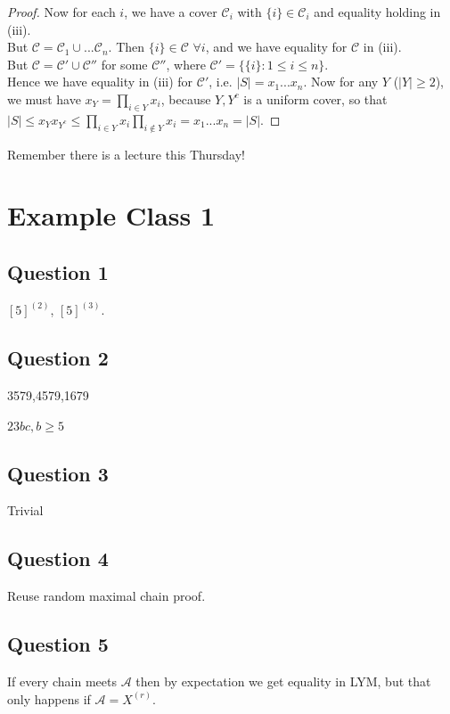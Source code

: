 \documentclass[a4paper]{article}
\begin{document}
\begin{thm}
\begin{proof}
        Now for each $i$, we have a cover $\mathcal{C}_i$ with $\{i\} \in \mathcal{C}_i$ and equality holding in (iii).\\
        But $\mathcal{C} = \mathcal{C}_1 \cup ... \mathcal{C}_n$. Then $\{i\} \in \mathcal{C}$ $\forall i$, and we have equality for $\mathcal{C}$ in (iii).\\
        But $\mathcal{C} = \mathcal{C}' \cup \mathcal{C}''$ for some $\mathcal{C}''$, where $\mathcal{C}' = \{\{i\}:1 \leq i \leq n\}$.\\
        Hence we have equality in (iii) for $\mathcal{C}'$, i.e. $|S| = x_1...x_n$. Now for any $Y$ ($|Y| \geq 2$), we must have $x_Y = \prod_{i \in Y} x_i$, because $Y,Y^c$ is a uniform cover, so that $|S| \leq x_Y x_{Y^c} \leq \prod_{i \in Y} x_i \prod_{i \not\in Y} x_i = x_1...x_n = |S|$.
    \end{proof}
\end{thm}

Remember there is a lecture this Thursday!




\newpage

\section{Example Class 1}

\subsection{Question 1}
$[5]^{(2)}$, $[5]^{(3)}$.

\subsection{Question 2}
3579,4579,1679

$23bc, b \geq 5$

\subsection{Question 3}
Trivial

\subsection{Question 4}
Reuse random maximal chain proof.

\subsection{Question 5}
If every chain meets $\mathcal{A}$ then by expectation we get equality in LYM, but that only happens if $\mathcal{A} = X^{(r)}$.
\end{document}
